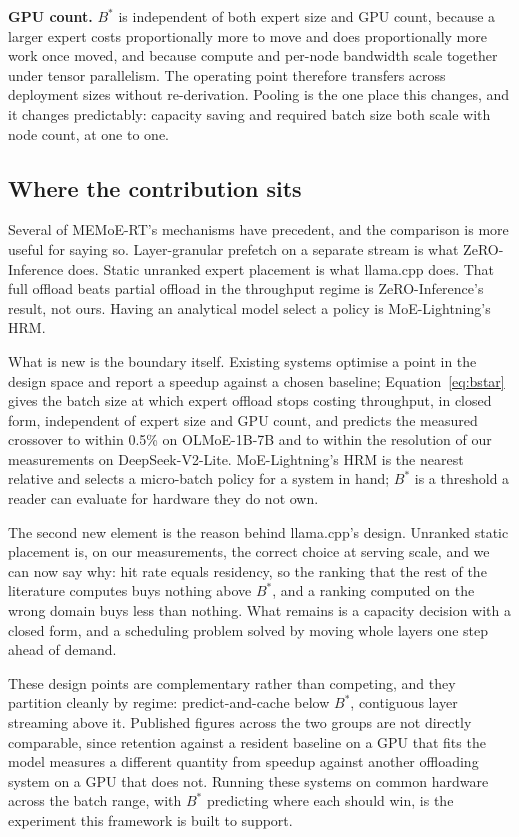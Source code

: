 \textbf{GPU count.} $B^{*}$ is independent of both expert size and GPU count,
because a larger expert costs proportionally more to move and does proportionally
more work once moved, and because compute and per-node bandwidth scale together
under tensor parallelism. The operating point therefore transfers across
deployment sizes without re-derivation. Pooling is the one place this changes, and
it changes predictably: capacity saving and required batch size both scale with
node count, at one to one.

\subsection{Where the contribution sits}

Several of MEMoE-RT's mechanisms have precedent, and the comparison is more useful
for saying so. Layer-granular prefetch on a separate stream is what
ZeRO-Inference does. Static unranked expert placement is what llama.cpp does. That
full offload beats partial offload in the throughput regime is ZeRO-Inference's
result, not ours. Having an analytical model select a policy is MoE-Lightning's
HRM.

What is new is the boundary itself. Existing systems optimise a point in the
design space and report a speedup against a chosen baseline; Equation~\ref{eq:bstar}
gives the batch size at which expert offload stops costing throughput, in closed
form, independent of expert size and GPU count, and predicts the measured
crossover to within 0.5\% on OLMoE-1B-7B and to within the resolution of our
measurements on DeepSeek-V2-Lite. MoE-Lightning's HRM is the nearest relative and
selects a micro-batch policy for a system in hand; $B^{*}$ is a threshold a reader
can evaluate for hardware they do not own.

The second new element is the reason behind llama.cpp's design. Unranked static
placement is, on our measurements, the correct choice at serving scale, and we can
now say why: hit rate equals residency, so the ranking that the rest of the
literature computes buys nothing above $B^{*}$, and a ranking computed on the
wrong domain buys less than nothing. What remains is a capacity decision with a
closed form, and a scheduling problem solved by moving whole layers one step ahead
of demand.

These design points are complementary rather than competing, and they partition
cleanly by regime: predict-and-cache below $B^{*}$, contiguous layer streaming
above it. Published figures across the two groups are not directly comparable,
since retention against a resident baseline on a GPU that fits the model measures
a different quantity from speedup against another offloading system on a GPU that
does not. Running these systems on common hardware across the batch range, with
$B^{*}$ predicting where each should win, is the experiment this framework is
built to support.
